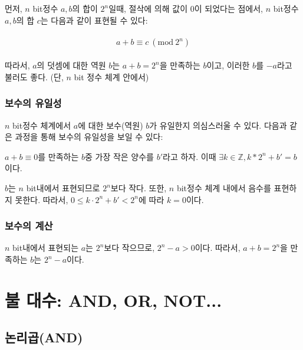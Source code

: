 \documentclass[a4paper,12pt]{book}
\newcommand{\Mod}[1]{\ (\mathrm{mod}\ #1)}
\begin{document}
\begin{appendices}
        먼저, $n$ bit정수 $a, b$의 합이 $2^n$일때,
        절삭에 의해 값이 0이 되었다는 점에서,
        $n$ bit정수 $a, b$의 합 $c$는 다음과 같이 표현될 수 있다:

        \begin{align}
            \begin{split}
                a + b \equiv c \Mod{2^n}
            \end{split}
        \end{align}

        따라서, $a$의 덧셈에 대한 역원 $b$는 $a + b = 2^n$을 만족하는 $b$이고,
        이러한 $b$를 $-a$라고 불러도 좋다. (단, $n$ bit 정수 체계 안에서)


        \subsubsection{보수의 유일성}

            $n$ bit정수 체계에서 $a$에 대한 보수(역원) $b$가 유일한지 의심스러울 수 있다.
            다음과 같은 과정을 통해 보수의 유일성을 보일 수 있다:

            $a + b \equiv 0$를 만족하는 $b$중 가장 작은 양수를 $b'$라고 하자.
            이때 $\exists k \in \mathbb{Z}, k*2^n + b' = b$이다.

            $b$는 $n$ bit내에서 표현되므로 $2^n$보다 작다.
            또한, $n$ bit정수 체계 내에서 음수를 표현하지 못한다.
            따라서, $0 \le k \cdot 2^n + b' < 2^n$에 따라 $k = 0$이다.


        \subsubsection{보수의 계산}

            $n$ bit내에서 표현되는 $a$는 $2^n$보다 작으므로,
            $2^n - a > 0$이다.
            따라서, $a + b = 2^n$을 만족하는 $b$는 $2^n - a$이다.


\section{불 대수: AND, OR, NOT...}

    \subsection{논리곱(AND)}


\end{appendices}
\end{document}
